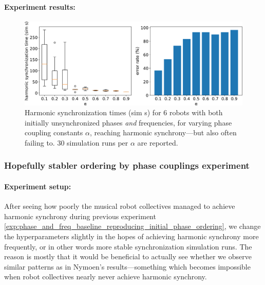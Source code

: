 			\paragraph{Experiment results:\nl}
			
			\begin{figure}[ht!]
				\centering
				\includegraphics[width=\linewidth]{Assets/DocSegments/Chapters/ExperimentsAndResults/Figures/PerfScores/baseline_reproducing_phase_and_freq_sync_for_alpha.pdf}
				\caption[Experiment results for first $\phi$ \& $\omega$ synchronization baseline reproduction experiment.]{Harmonic synchronization times (sim s) for 6 robots with both initially unsynchronized phases \textit{and} frequencies, for varying phase coupling constants $\alpha$, reaching harmonic synchrony—but also often failing to. 30 simulation runs per $\alpha$ are reported.}
				\label{fig:baseline_reproducing_phase_and_freq_sync_for_alpha}
			\end{figure}
			
		
		
		\subsubsection{Hopefully stabler ordering by phase couplings experiment}
		
			\paragraph{Experiment setup:\nl}
			
			After seeing how poorly the musical robot collectives managed to achieve harmonic synchrony during previous experiment \ref{exp:phase_and_freq_baseline_reproducing_initial_phase_ordering}, we change the hyperparameters slightly in the hopes of achieving harmonic synchrony more frequently, or in other words more stable synchronization simulation runs. The reason is mostly that it would be beneficial to actually see whether we observe similar patterns as in Nymoen's results—something which becomes impossible when robot collectives nearly never achieve harmonic synchrony.
			

